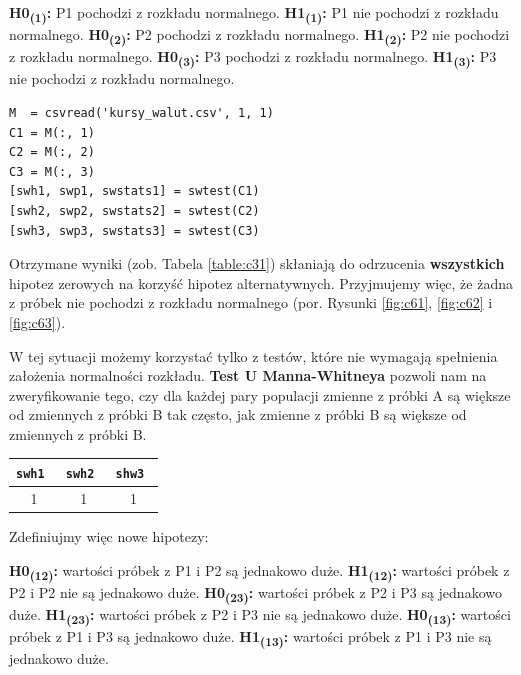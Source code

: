 \documentclass[12pt, a4paper]{article}
\begin{document}
\textbf{H0\textsubscript{(1)}:} P1 pochodzi z rozkładu normalnego. \newline
\textbf{H1\textsubscript{(1)}:} P1 nie pochodzi z rozkładu normalnego. \newline
\textbf{H0\textsubscript{(2)}:} P2 pochodzi z rozkładu normalnego. \newline
\textbf{H1\textsubscript{(2)}:} P2 nie pochodzi z rozkładu normalnego. \newline
\textbf{H0\textsubscript{(3)}:} P3 pochodzi z rozkładu normalnego. \newline
\textbf{H1\textsubscript{(3)}:} P3 nie pochodzi z rozkładu normalnego. \newline

\begin{lstlisting}[frame=single,label={listing:c31},caption={badanie, czy próbki pochodzą z rozkładu normalnego.},captionpos=b]
M  = csvread('kursy_walut.csv', 1, 1)
C1 = M(:, 1) 
C2 = M(:, 2) 
C3 = M(:, 3)
[swh1, swp1, swstats1] = swtest(C1)
[swh2, swp2, swstats2] = swtest(C2)
[swh3, swp3, swstats3] = swtest(C3)
\end{lstlisting}

Otrzymane wyniki (zob. Tabela \ref{table:c31}) skłaniają do odrzucenia \textbf{wszystkich} hipotez zerowych na korzyść hipotez alternatywnych. Przyjmujemy więc, że żadna z próbek nie pochodzi z rozkładu normalnego (por. Rysunki \ref{fig:c61}, \ref{fig:c62} i \ref{fig:c63}).

W tej sytuacji możemy korzystać tylko z testów, które nie wymagają spełnienia założenia normalności rozkładu. \textbf{Test U Manna-Whitneya} pozwoli nam na zweryfikowanie tego, czy dla każdej pary populacji zmienne z próbki A są większe od zmiennych z próbki B tak często, jak zmienne z próbki B są większe od zmiennych z próbki B.

\begin{center}
  \begin{tabular}{|c|c|c|}\hline
    \tt swh1 & \tt swh2 & \tt shw3 \\\hline
    1 & 1 & 1 \\\hline
  \end{tabular}
  \label{table:c31}
\end{center}

\noindent Zdefiniujmy więc nowe hipotezy:\newline

\noindent
\textbf{H0\textsubscript{(12)}:} wartości próbek z P1 i P2 są jednakowo duże. \newline
\textbf{H1\textsubscript{(12)}:} wartości próbek z P2 i P2 nie są jednakowo duże. \newline
\textbf{H0\textsubscript{(23)}:} wartości próbek z P2 i P3 są jednakowo duże. \newline
\textbf{H1\textsubscript{(23)}:} wartości próbek z P2 i P3 nie są jednakowo duże. \newline
\textbf{H0\textsubscript{(13)}:} wartości próbek z P1 i P3 są jednakowo duże. \newline
\textbf{H1\textsubscript{(13)}:} wartości próbek z P1 i P3 nie są jednakowo duże. \newline
\end{document}
